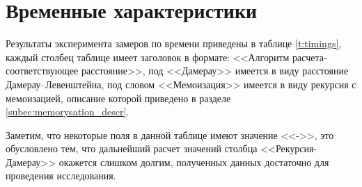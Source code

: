\clearpage

\section{Временные характеристики}

Результаты эксперимента замеров по времени приведены в таблице \ref{t:timings}, каждый столбец таблице имеет заголовок в формате:
<<Алгоритм расчета-соответствующее расстояние>>, под <<Дамерау>> имеется в виду расстояние Дамерау--Левенштейна, под словом
<<Мемоизация>> имеется в виду  рекурсия с мемоизацией, описание которой приведено в разделе \ref{subec:memorysation_descr}.

Заметим, что некоторые поля в данной таблице
имеют значение <<->>, это обусловлено тем, что дальнейший расчет значений столбца <<Рекурсия-Дамерау>> окажется слишком
долгим, полученных данных достаточно для проведения исследования.

